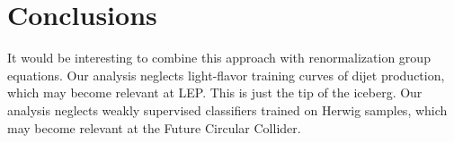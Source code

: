 \section{Conclusions}\label{sec:conclusions}

It would be interesting to combine this approach with renormalization
group equations. Our analysis neglects light-flavor training curves of
dijet production, which may become relevant at LEP. This is just the tip
of the iceberg. Our analysis neglects weakly supervised classifiers
trained on Herwig samples, which may become relevant at the Future
Circular Collider.

